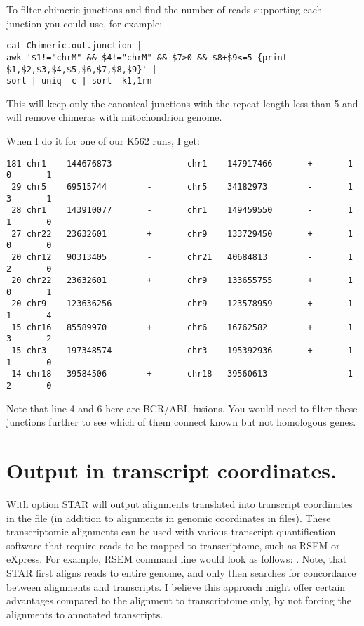 \documentclass[12pt]{article}
\begin{document}
To filter chimeric junctions and find the number of reads supporting each junction you could use, for example:
\begin{verbatim}
cat Chimeric.out.junction | 
awk '$1!="chrM" && $4!="chrM" && $7>0 && $8+$9<=5 {print $1,$2,$3,$4,$5,$6,$7,$8,$9}' | 
sort | uniq -c | sort -k1,1rn
\end{verbatim}
This will keep only the canonical junctions with the repeat length less than 5 and will remove chimeras with mitochondrion genome.

When I do it for one of our K562 runs, I get:
\begin{verbatim}
181 chr1    144676873       -       chr1    147917466       +       1       0       1
 29 chr5    69515744        -       chr5    34182973        -       1       3       1
 28 chr1    143910077       -       chr1    149459550       -       1       1       0
 27 chr22   23632601        +       chr9    133729450       +       1       0       0
 20 chr12   90313405        -       chr21   40684813        -       1       2       0
 20 chr22   23632601        +       chr9    133655755       +       1       0       1
 20 chr9    123636256       -       chr9    123578959       +       1       1       4
 15 chr16   85589970        +       chr6    16762582        +       1       3       2
 15 chr3    197348574       -       chr3    195392936       +       1       1       0
 14 chr18   39584506        +       chr18   39560613        -       1       2       0
\end{verbatim}
Note that line 4 and 6 here are BCR/ABL fusions. You would need to filter these junctions further to see which of them connect known but not homologous genes. 


\section{Output in transcript coordinates.}
With   option STAR will output alignments translated into transcript coordinates in the  file (in addition to alignments in genomic coordinates in  files). These transcriptomic alignments can be used with various transcript quantification software that require reads to be mapped to transcriptome, such as RSEM or eXpress. For example, RSEM command line would look as follows: .
Note, that STAR first aligns reads to entire genome, and only then searches for concordance between alignments and transcripts. I believe this approach might offer certain advantages compared to the alignment to transcriptome only, by not forcing the alignments to annotated transcripts.
\end{document}
